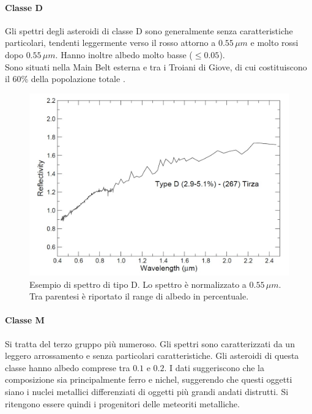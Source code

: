 \paragraph*{Classe D}
Gli spettri degli asteroidi di classe D sono generalmente senza caratteristiche particolari, tendenti leggermente verso il rosso attorno a $0.55\,\mu m$ e molto rossi dopo $0.55\,\mu m$. Hanno inoltre albedo molto basse ($\leq 0.05$).\\
Sono situati nella Main Belt esterna e tra i Troiani di Giove, di cui costituiscono il 60\% della popolazione totale \citep{VILAS1985503}.

\begin{figure}[!h]
    \centering
    \includegraphics[scale=0.3]{figure/spettro_d.jpg}
    \caption[Esempio di spettro di tipo D.]{Esempio di spettro di tipo D. Lo spettro è normalizzato a $0.55\,\mu m$. Tra parentesi è riportato il range di albedo in percentuale. \citep{magrin_spectroscopic_nodate}}
    \label{spettro_d}
\end{figure}

\paragraph*{Classe M}
Si tratta del terzo gruppo più numeroso. Gli spettri sono caratterizzati da un leggero arrossamento e senza particolari caratteristiche. Gli asteroidi di questa classe hanno albedo comprese tra $0.1$ e $0.2$. I dati suggeriscono che la composizione sia principalmente ferro e nichel, suggerendo che questi oggetti siano i nuclei metallici differenziati di oggetti più grandi andati distrutti. Si ritengono essere quindi i progenitori delle meteoriti metalliche.

